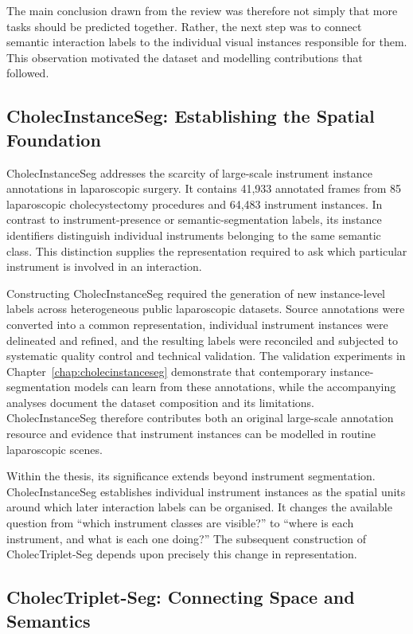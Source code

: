 The main conclusion drawn from the review was therefore not simply that more tasks should be predicted together. Rather, the next step was to connect semantic interaction labels to the individual visual instances responsible for them. This observation motivated the dataset and modelling contributions that followed.

\subsection{CholecInstanceSeg: Establishing the Spatial Foundation}
\label{sec:discussion-cholecinstanceseg}

CholecInstanceSeg addresses the scarcity of large-scale instrument instance annotations in laparoscopic surgery. It contains 41,933 annotated frames from 85 laparoscopic cholecystectomy procedures and 64,483 instrument instances. In contrast to instrument-presence or semantic-segmentation labels, its instance identifiers distinguish individual instruments belonging to the same semantic class. This distinction supplies the representation required to ask which particular instrument is involved in an interaction.

Constructing CholecInstanceSeg required the generation of new instance-level labels across heterogeneous public laparoscopic datasets. Source annotations were converted into a common representation, individual instrument instances were delineated and refined, and the resulting labels were reconciled and subjected to systematic quality control and technical validation. The validation experiments in Chapter~\ref{chap:cholecinstanceseg} demonstrate that contemporary instance-segmentation models can learn from these annotations, while the accompanying analyses document the dataset composition and its limitations. CholecInstanceSeg therefore contributes both an original large-scale annotation resource and evidence that instrument instances can be modelled in routine laparoscopic scenes.

Within the thesis, its significance extends beyond instrument segmentation. CholecInstanceSeg establishes individual instrument instances as the spatial units around which later interaction labels can be organised. It changes the available question from ``which instrument classes are visible?'' to ``where is each instrument, and what is each one doing?'' The subsequent construction of CholecTriplet-Seg depends upon precisely this change in representation.

\subsection{CholecTriplet-Seg: Connecting Space and Semantics}
\label{sec:discussion-cholectripletseg}


